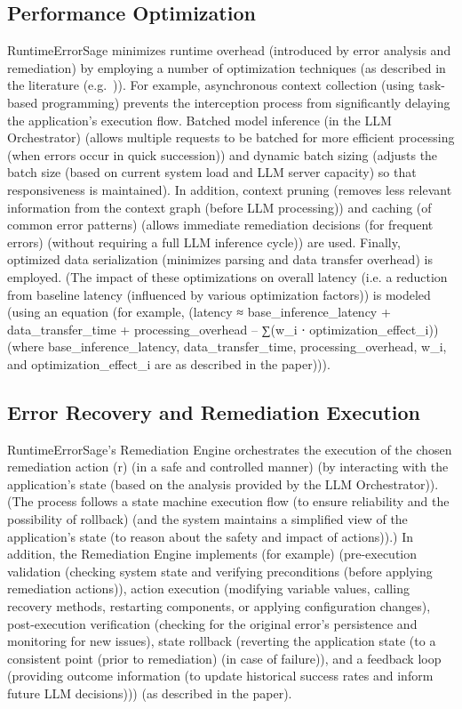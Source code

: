 \subsection{Performance Optimization}
RuntimeErrorSage minimizes runtime overhead (introduced by error analysis and remediation) by employing a number of optimization techniques (as described in the literature (e.g.~\cite{llm_inference_optimization_2021, performance_tuning_dotnet_2020})). For example, asynchronous context collection (using task-based programming) prevents the interception process from significantly delaying the application's execution flow. Batched model inference (in the LLM Orchestrator) (allows multiple requests to be batched for more efficient processing (when errors occur in quick succession)) and dynamic batch sizing (adjusts the batch size (based on current system load and LLM server capacity) so that responsiveness is maintained). In addition, context pruning (removes less relevant information from the context graph (before LLM processing)) and caching (of common error patterns) (allows immediate remediation decisions (for frequent errors) (without requiring a full LLM inference cycle)) are used. Finally, optimized data serialization (minimizes parsing and data transfer overhead) is employed. (The impact of these optimizations on overall latency (i.e. a reduction from baseline latency (influenced by various optimization factors)) is modeled (using an equation (for example, (latency ≈ base_inference_latency + data_transfer_time + processing_overhead – ∑(w_i ⋅ optimization_effect_i)) (where base_inference_latency, data_transfer_time, processing_overhead, w_i, and optimization_effect_i are as described in the paper))).

\subsection{Error Recovery and Remediation Execution}
RuntimeErrorSage's Remediation Engine orchestrates the execution of the chosen remediation action (r) (in a safe and controlled manner) (by interacting with the application's state (based on the analysis provided by the LLM Orchestrator)). (The process follows a state machine execution flow (to ensure reliability and the possibility of rollback) (and the system maintains a simplified view of the application's state (to reason about the safety and impact of actions)).) In addition, the Remediation Engine implements (for example) (pre-execution validation (checking system state and verifying preconditions (before applying remediation actions)), action execution (modifying variable values, calling recovery methods, restarting components, or applying configuration changes), post-execution verification (checking for the original error's persistence and monitoring for new issues), state rollback (reverting the application state (to a consistent point (prior to remediation) (in case of failure)), and a feedback loop (providing outcome information (to update historical success rates and inform future LLM decisions))) (as described in the paper).

